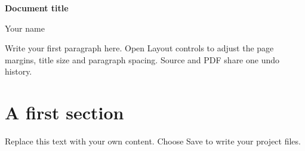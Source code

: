 \documentclass[11pt]{article}
\begin{document}
{\fontsize{18}{22}\selectfont\textbf{Document title}}\par
Your name\par
\vspace{4mm}

Write your first paragraph here. Open Layout controls to adjust the page
margins, title size and paragraph spacing. Source and PDF share one undo history.

\section*{A first section}
Replace this text with your own content. Choose Save to write your project files.
\end{document}
